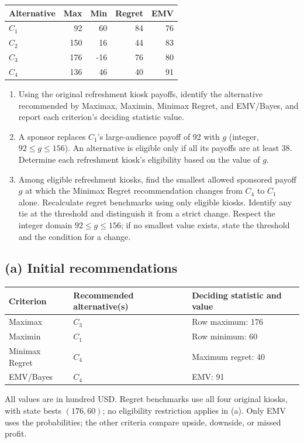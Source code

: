 \begin{center}\small\setlength{\tabcolsep}{4pt}
	\begin{tabular}{lrrrr}\toprule
		Alternative & Max & Min & Regret & EMV\\ \midrule
				$C_1$ & 92 & 60 & 84 & 76\\
		$C_2$ & 150 & 16 & 44 & 83\\
		$C_3$ & 176 & -16 & 76 & 80\\
		$C_4$ & 136 & 46 & 40 & 91\\
		\bottomrule
	\end{tabular}
\end{center}

\begin{enumerate}[label=\textbf{(\alph*)},leftmargin=*]
	\item Using the original refreshment kiosk payoffs, identify the alternative recommended by Maximax, Maximin, Minimax Regret, and EMV/Bayes, and report each criterion's deciding statistic value. 

	\item A sponsor replaces $C_1$'s large-audience payoff of 92 with $g$ (integer, $92\leq g\leq156$). An alternative is eligible only if all its payoffs are at least 38. Determine each refreshment kiosk's eligibility based on the value of $g$. 

	\item Among eligible refreshment kiosks, find the smallest allowed sponsored payoff $g$ at which the Minimax Regret recommendation changes from $C_4$ to $C_1$ alone. Recalculate regret benchmarks using only eligible kiosks. Identify any tie at the threshold and distinguish it from a strict change. Respect the integer domain $92\leq g\leq156$; if no smallest value exists, state the threshold and the condition for a change. 
\end{enumerate}
\label{sol:q2a}
\subsection*{(a) Initial recommendations }
\begin{center}
\begin{tabular}{lll}\toprule
Criterion & Recommended alternative(s) & Deciding statistic and value\\ \midrule
		Maximax & $C_3$ & Row maximum: 176\\
		Maximin & $C_1$ & Row minimum: 60\\
		Minimax Regret & $C_4$ & Maximum regret: 40\\
		EMV/Bayes & $C_4$ & EMV: 91\\
		\bottomrule\end{tabular}
\end{center}
All values are in hundred USD. Regret benchmarks use all four original kiosks, with state bests $(176,60)$; no eligibility restriction applies in (a). Only EMV uses the probabilities; the other criteria compare upside, downside, or missed profit.
\secInicio[sec:q2]



